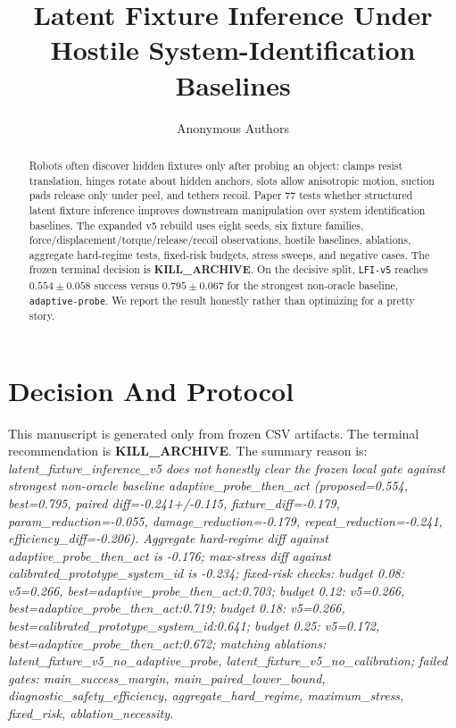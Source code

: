 \documentclass{article}
\title{Latent Fixture Inference Under Hostile System-Identification Baselines}
\author{Anonymous Authors}
\begin{document}
\maketitle

\begin{abstract}
Robots often discover hidden fixtures only after probing an object: clamps resist translation, hinges rotate about hidden anchors, slots allow anisotropic motion, suction pads release only under peel, and tethers recoil.  Paper 77 tests whether structured latent fixture inference improves downstream manipulation over system identification baselines.  The expanded v5 rebuild uses eight seeds, six fixture families, force/displacement/torque/release/recoil observations, hostile baselines, ablations, aggregate hard-regime tests, fixed-risk budgets, stress sweeps, and negative cases.  The frozen terminal decision is \textbf{KILL\_ARCHIVE}.  On the decisive split, \texttt{LFI-v5} reaches $0.554 \pm 0.058$ success versus $0.795 \pm 0.067$ for the strongest non-oracle baseline, \texttt{adaptive-probe}.  We report the result honestly rather than optimizing for a pretty story.
\end{abstract}

\section{Decision And Protocol}
This manuscript is generated only from frozen CSV artifacts.  The terminal recommendation is \textbf{KILL\_ARCHIVE}.  The summary reason is: \emph{latent\_fixture\_inference\_v5 does not honestly clear the frozen local gate against strongest non-oracle baseline adaptive\_probe\_then\_act (proposed=0.554, best=0.795, paired diff=-0.241+/-0.115, fixture\_diff=-0.179, param\_reduction=-0.055, damage\_reduction=-0.179, repeat\_reduction=-0.241, efficiency\_diff=-0.206). Aggregate hard-regime diff against adaptive\_probe\_then\_act is -0.176; max-stress diff against calibrated\_prototype\_system\_id is -0.234; fixed-risk checks: budget 0.08: v5=0.266, best=adaptive\_probe\_then\_act:0.703; budget 0.12: v5=0.266, best=adaptive\_probe\_then\_act:0.719; budget 0.18: v5=0.266, best=calibrated\_prototype\_system\_id:0.641; budget 0.25: v5=0.172, best=adaptive\_probe\_then\_act:0.672; matching ablations: latent\_fixture\_v5\_no\_adaptive\_probe, latent\_fixture\_v5\_no\_calibration; failed gates: main\_success\_margin, main\_paired\_lower\_bound, diagnostic\_safety\_efficiency, aggregate\_hard\_regime, maximum\_stress, fixed\_risk, ablation\_necessity.}
\end{document}
